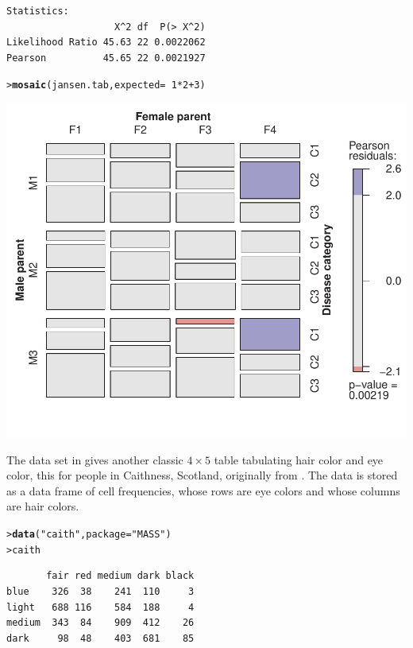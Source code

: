 \documentclass[10pt]{report}\usepackage[]{graphicx}\usepackage[]{color}
\makeatletter
\newcommand{\hlnum}[1]{\textcolor[rgb]{0.686,0.059,0.569}{#1}}%
\newcommand{\hlstr}[1]{\textcolor[rgb]{0.192,0.494,0.8}{#1}}%
\newcommand{\hlopt}[1]{\textcolor[rgb]{0,0,0}{#1}}%
\newcommand{\hlstd}[1]{\textcolor[rgb]{0.345,0.345,0.345}{#1}}%
\newcommand{\hlkwc}[1]{\textcolor[rgb]{0.333,0.667,0.333}{#1}}%
\newcommand{\hlkwd}[1]{\textcolor[rgb]{0.737,0.353,0.396}{\textbf{#1}}}%
\newenvironment{kframe}{%
 \def\at@end@of@kframe{}%
 \ifinner\ifhmode%
  \def\at@end@of@kframe{\end{minipage}}%
  \begin{minipage}{\columnwidth}%
 \fi\fi%
 \def\FrameCommand##1{\hskip\@totalleftmargin \hskip-\fboxsep
 \colorbox{shadecolor}{##1}\hskip-\fboxsep
     \hskip-\linewidth \hskip-\@totalleftmargin \hskip\columnwidth}%
 \MakeFramed {\advance\hsize-\width
   \@totalleftmargin\z@ \linewidth\hsize
   \@setminipage}}%
 {\par\unskip\endMakeFramed%
 \at@end@of@kframe}
\newenvironment{knitrout}{}{} %
\renewenvironment{knitrout}{\small\renewcommand{\baselinestretch}{.85}}{} %
\makeatother
\begin{document}
\begin{Exercises}
\begin{enumerate*}
\begin{ans}
\begin{knitrout}
\begin{kframe}
\begin{verbatim}
Statistics:
                   X^2 df  P(> X^2)
Likelihood Ratio 45.63 22 0.0022062
Pearson          45.65 22 0.0021927
\end{verbatim}
\begin{alltt}
\hlstd{> }\hlkwd{mosaic}\hlstd{(jansen.tab,} \hlkwc{expected} \hlstd{=} \hlopt{~} \hlnum{1}\hlopt{*}\hlnum{2}\hlopt{+}\hlnum{3}\hlstd{)}
\end{alltt}
\end{kframe}

\centerline{\includegraphics[width=.5\textwidth]{soln/fig/ex5_6c-1} }



\end{knitrout}

    \end{ans}
    
  \end{enumerate*}

  \exercise The data set  in  gives another
  classic $4 \times 5$ table 
  tabulating hair color and eye color, this for  
  people in Caithness, Scotland, originally from
  \citet{Fisher:1940}.  The data is stored as a data frame of cell frequencies, whose rows are eye colors
  and whose columns are hair colors.
\begin{knitrout}\footnotesize
{}\color{fgcolor}\begin{kframe}
\begin{alltt}
\hlstd{> }\hlkwd{data}\hlstd{(}\hlstr{"caith"}\hlstd{,} \hlkwc{package} \hlstd{=} \hlstr{"MASS"}\hlstd{)}
\hlstd{> }\hlstd{caith}
\end{alltt}
\begin{verbatim}
       fair red medium dark black
blue    326  38    241  110     3
light   688 116    584  188     4
medium  343  84    909  412    26
dark     98  48    403  681    85
\end{verbatim}
\end{kframe}
\end{knitrout}


\end{Exercises}
\end{document}
